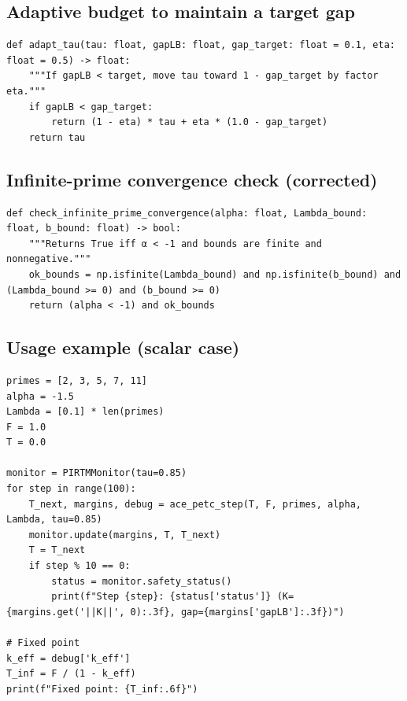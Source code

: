 \documentclass[11pt]{article}
\theoremstyle{definition}
\theoremstyle{remark}
\newcommand{\1}{\mathbf{1}}
\begin{document}
\subsection{Adaptive budget to maintain a target gap}
\begin{lstlisting}[style=py,caption={Simple adaptive policy for τ to keep a safety gap}]
def adapt_tau(tau: float, gapLB: float, gap_target: float = 0.1, eta: float = 0.5) -> float:
    """If gapLB < target, move tau toward 1 - gap_target by factor eta."""
    if gapLB < gap_target:
        return (1 - eta) * tau + eta * (1.0 - gap_target)
    return tau
\end{lstlisting}

\subsection{Infinite-prime convergence check (corrected)}
\begin{lstlisting}[style=py,caption={Absolute convergence test for ∑ b_p|Λ_p|p^α}]
def check_infinite_prime_convergence(alpha: float, Lambda_bound: float, b_bound: float) -> bool:
    """Returns True iff α < -1 and bounds are finite and nonnegative."""
    ok_bounds = np.isfinite(Lambda_bound) and np.isfinite(b_bound) and (Lambda_bound >= 0) and (b_bound >= 0)
    return (alpha < -1) and ok_bounds
\end{lstlisting}

\subsection{Usage example (scalar case)}
\begin{lstlisting}[style=py,caption={Scalar PIRTM loop with monitoring and fixed-point estimate}]
primes = [2, 3, 5, 7, 11]
alpha = -1.5
Lambda = [0.1] * len(primes)
F = 1.0
T = 0.0

monitor = PIRTMMonitor(tau=0.85)
for step in range(100):
    T_next, margins, debug = ace_petc_step(T, F, primes, alpha, Lambda, tau=0.85)
    monitor.update(margins, T, T_next)
    T = T_next
    if step % 10 == 0:
        status = monitor.safety_status()
        print(f"Step {step}: {status['status']} (K={margins.get('||K||', 0):.3f}, gap={margins['gapLB']:.3f})")

# Fixed point
k_eff = debug['k_eff']
T_inf = F / (1 - k_eff)
print(f"Fixed point: {T_inf:.6f}")
\end{lstlisting}
\end{document}
